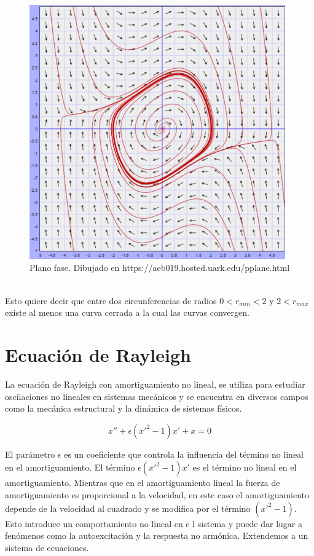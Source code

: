 \documentclass[12pt, a4paper]{report}
\begin{document}
\begin{figure}[h]
	\centering
	\includegraphics[width=11cm]{vanderpol.png}
	\caption{Plano fase. Dibujado en https://aeb019.hosted.uark.edu/pplane.html}
\end{figure}
\\Esto quiere decir que entre dos circunferencias de radios $0<r_{min}<2$ y $2<r_{max}$
existe al menos una curva cerrada a la cual las curvas convergen.

\newpage

\section{Ecuación de Rayleigh}
La ecuación de Rayleigh con amortiguamiento no lineal, se utiliza
para estudiar oscilaciones no lineales en sistemas mecánicos y se encuentra en
diversos campos como la mecánica estructural y la dinámica de sistemas físicos.

$$x''+\epsilon(x'^2-1)x'+x=0$$

El parámetro $\epsilon$ es un coeficiente que controla la influencia del término no lineal en el amortiguamiento.
El término $\epsilon(x'^2 - 1)x'$ es el término no lineal en el amortiguamiento. Mientras que en el amortiguamiento
lineal la fuerza de amortiguamiento es proporcional a la velocidad, en este caso el amortiguamiento depende de
la velocidad al cuadrado y se modifica por el término $(x'^2 - 1)$. Esto introduce un comportamiento no lineal en e
l sistema y puede dar lugar a fenómenos como la autoexcitación y la respuesta no armónica.
Extendemos a un sistema de ecuaciones.
\end{document}

